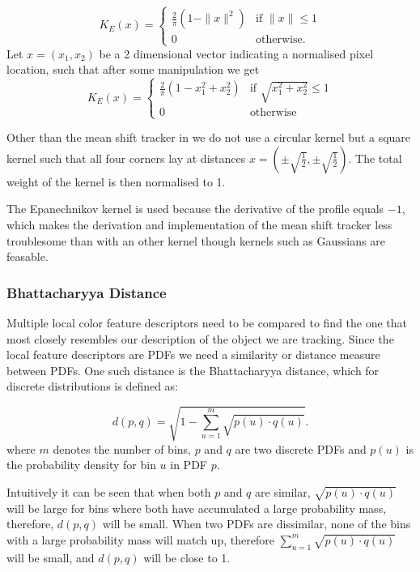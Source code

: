 \documentclass[a4paper,11pt]{article}
\begin{document}
\begin{equation}
\label{eq:epanechnikov_kernel1}
K_E(x) = \left\{ \begin{array}{cl}
  \frac{2}{\pi} (1-\|x\|^2) & \textrm{if } \|x\| \leq 1 \\
  0 & \textrm{otherwise.} \end{array}\right.
\end{equation}
Let $x = (x_1,x_2)$ be a 2 dimensional vector indicating a normalised pixel location, such that after some manipulation we get
\begin{equation}
\label{eq:epanechnikov_kernel2}
K_E(x) = \left\{ \begin{array}{cl}
  \frac{2}{\pi} (1-x_1^2 + x_2^2) & \textrm{if } \sqrt{x_1^2 + x_2^2} \leq 1 \\
  0 & \textrm{otherwise} \end{array}\right.
\end{equation}

Other than the mean shift tracker in \cite{mean_shift} we do not use a circular kernel but a square kernel such that all four corners lay at distances $x=(\pm \sqrt{\frac{1}{2}},\pm \sqrt{\frac{1}{2}})$. The total weight of the kernel is then normalised to 1.

The Epanechnikov kernel is used because the derivative of the profile equals $-1$, which makes the derivation and implementation of the mean shift tracker less troublesome than with an other kernel though kernels such as Gaussians are feasable.

\subsubsection{Bhattacharyya Distance}
Multiple local color feature descriptors need to be compared to find the one that most closely resembles our description of the object we are tracking. Since the local feature descriptors are PDFs we need a similarity or distance measure between PDFs. One such distance is the Bhattacharyya distance, which for discrete distributions is defined as:

\begin{equation}
\label{eq:bhattdistance}
d(p,q) = \sqrt{1-\sum_{u=1}^{m} \sqrt{p(u)\cdot q(u)}}.
\end{equation}
where $m$ denotes the number of bins, $p$ and $q$ are two discrete PDFs and $p(u)$ is the probability density for bin $u$ in PDF $p$. 

Intuitively it can be seen that when both $p$ and $q$ are similar, $\sqrt{p(u)\cdot q(u)}$ will be large for bins where both have accumulated a large probability mass, therefore, $d(p,q)$ will be small. When two PDFs are dissimilar, none of the bins with a large probability mass will match up, therefore  $\sum_{u=1}^{m} \sqrt{p(u)\cdot q(u)}$ will be small, and $d(p,q)$ will be close to 1.
\end{document}
